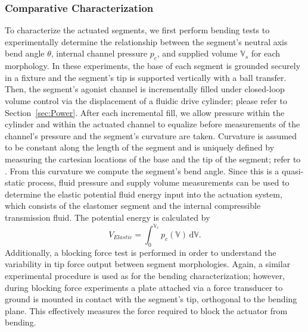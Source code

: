 \subsubsection{Comparative Characterization}
\label{subsubsec:Actuators, Actuator Morphologies, Characterization}
To characterize the actuated segments, we first perform bending tests to experimentally determine the relationship between the segment's neutral axis bend angle $\theta$, internal channel pressure $p_c$, and supplied volume $\mathbb{V}_s$ for each morphology.
%
In these experiments, the base of each segment is grounded securely in a fixture and the segment's tip is supported vertically with a ball transfer. %
%
Then, the segment's agonist channel is incrementally filled under closed-loop volume control via the displacement of a fluidic drive cylinder; please refer to Section~\ref{sec:Power}.
%
After each incremental fill, we allow pressure within the cylinder and within the actuated channel to equalize before measurements of the channel's pressure and the segment's curvature are taken.
%
Curvature is assumed to be constant along the length of the segment and is uniquely defined by measuring the cartesian locations of the base and the tip of the segment; refer to \citet{marchese2014design}.
%
From this curvature we compute the segment's bend angle.
%
Since this is a quasi-static process, fluid pressure and supply volume measurements can be used to determine the elastic potential fluid energy input into the actuation system, which consists of the elastomer segment and the internal compressible transmission fluid.
The potential energy is calculated by
\begin{equation}\label{eqn:energy}
    V_{Elastic} = \int_0^{\mathbb{V}_c} p_c\left( \mathbb{V} \right) \, \text{d} \mathbb{V}.
\end{equation}
%
Additionally, a blocking force test is performed in order to understand the variability in tip force output between segment morphologies.
%
Again, a similar experimental procedure is used as for the bending characterization; however, during blocking force experiments a plate attached via a force transducer to ground is mounted in contact with the segment's tip, orthogonal to the bending plane.
%
This effectively measures the force required to block the actuator from bending.
%
